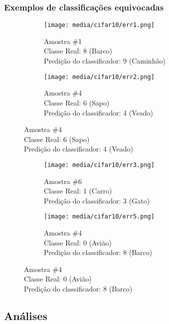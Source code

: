 \documentclass[a4paper]{article}
\begin{document}
\subsubsection{Exemplos de classificações equivocadas}

\begin{figure}[H]
    \centering
    \begin{subfigure}{.5\textwidth}
        \centerline{\texttt{[image: media/cifar10/err1.png]}}
        \caption{Amostra \#1  \\ Classe Real: 8 (Barco) \\ Predição do classificador: 9 (Caminhão)}
        \label{fig:fig20}
    \end{subfigure}%
    \begin{subfigure}{.5\textwidth}
        \centerline{\texttt{[image: media/cifar10/err2.png]}}
        \caption{Amostra \#4  \\ Classe Real: 6 (Sapo) \\ Predição do classificador: 4 (Veado)}
        \label{fig:fig21}
    \end{subfigure}%
\end{figure}
\begin{figure}[H]
    \centering
    \begin{subfigure}{.5\textwidth}
        \centerline{\texttt{[image: media/cifar10/err3.png]}}
        \caption{Amostra \#6  \\ Classe Real: 1 (Carro) \\ Predição do classificador: 3 (Gato)}
        \label{fig:fig22}
    \end{subfigure}%
    \begin{subfigure}{.5\textwidth}
        \centerline{\texttt{[image: media/cifar10/err5.png]}}
        \caption{Amostra \#4  \\ Classe Real: 0 (Avião) \\ Predição do classificador: 8 (Barco)}
        \label{fig:fig23}
    \end{subfigure}%
\end{figure}


\subsection{Análises}
\end{document}
